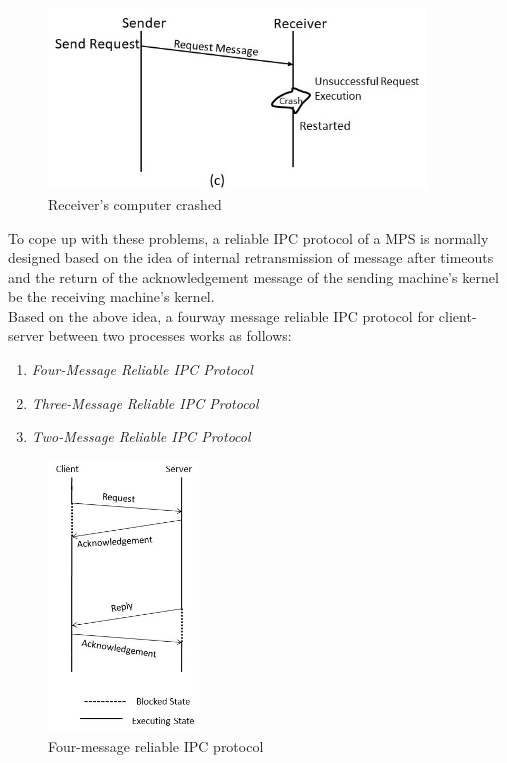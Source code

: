 \documentclass{beamer}
\begin{document}
\begin{frame}[allowframebreaks]
	\framebreak	
	\begin{figure}
		\centering
		\includegraphics[width=10cm]{fig36(c).jpg}
		\caption{Receiver's computer crashed}
	\end{figure}
	\framebreak	
	To cope up with these problems, a reliable IPC protocol of a MPS is normally designed
	based on the idea of internal retransmission of message after timeouts and the return
	of the acknowledgement message of the sending machine's kernel be the receiving
	machine's kernel.\\Based on the above idea, a fourway message reliable IPC protocol
	for client-server between two processes works as follows:
	\begin{enumerate}
		\item \textit{Four-Message Reliable IPC Protocol}
		\item \textit{Three-Message Reliable IPC Protocol}
		\item \textit{Two-Message Reliable IPC Protocol}
	\end{enumerate}		
	\begin{figure}
		\centering
		\includegraphics[width=4cm]{fig37.jpg}
		\caption{Four-message reliable IPC protocol}
	\end{figure}
\end{frame}
\end{document}
